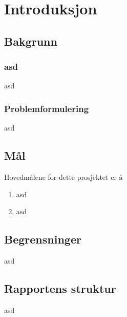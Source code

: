 \section[Introduksjon]{Introduksjon}
\subsection{Bakgrunn}
\subsubsection*{asd}
asd

\subsubsection*{Problemformulering}
asd

\subsection{Mål}
Hovedmålene for dette prosjektet er å
\begin{enumerate}
\item asd
\item asd
\end{enumerate}

\subsection{Begrensninger}
asd
\subsection{Rapportens struktur}
asd